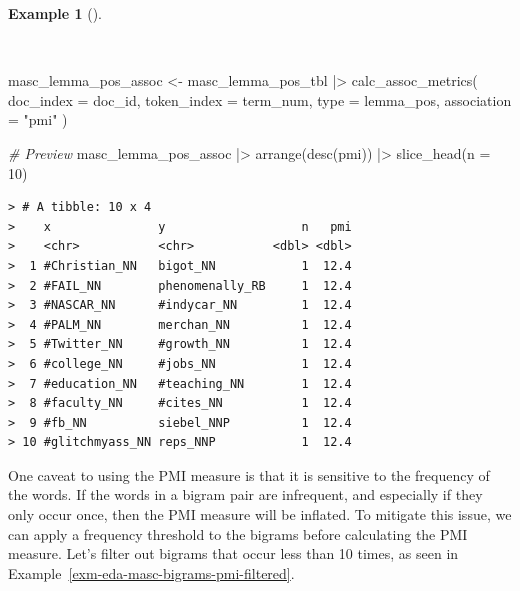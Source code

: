 \documentclass[
  letterpaper,
  DIV=11,
  numbers=noendperiod]{scrreport}
\newenvironment{Shaded}{\begin{snugshade}}{\end{snugshade}}
\newcommand{\AttributeTok}[1]{\textcolor[rgb]{0.00,0.00,0.00}{#1}}
\newcommand{\CommentTok}[1]{\textcolor[rgb]{0.00,0.00,0.00}{\textit{#1}}}
\newcommand{\DecValTok}[1]{\textcolor[rgb]{0.00,0.00,0.00}{#1}}
\newcommand{\FunctionTok}[1]{\textcolor[rgb]{0.00,0.00,0.00}{#1}}
\newcommand{\NormalTok}[1]{\textcolor[rgb]{0.00,0.00,0.00}{#1}}
\newcommand{\OtherTok}[1]{\textcolor[rgb]{0.00,0.00,0.00}{#1}}
\newcommand{\SpecialCharTok}[1]{\textcolor[rgb]{0.00,0.00,0.00}{#1}}
\newcommand{\StringTok}[1]{\textcolor[rgb]{0.00,0.00,0.00}{#1}}
\theoremstyle{definition}
\newtheorem{example}{Example}[chapter]
\theoremstyle{remark}
\begin{document}
\begin{example}[]\protect\hypertarget{exm-eda-masc-bigrams-pmi}{}\label{exm-eda-masc-bigrams-pmi}

~

\begin{Shaded}
\begin{Highlighting}[]
\NormalTok{masc\_lemma\_pos\_assoc }\OtherTok{\textless{}{-}} 
\NormalTok{  masc\_lemma\_pos\_tbl }\SpecialCharTok{|\textgreater{}} 
  \FunctionTok{calc\_assoc\_metrics}\NormalTok{(}
    \AttributeTok{doc\_index =}\NormalTok{ doc\_id, }
    \AttributeTok{token\_index =}\NormalTok{ term\_num, }
    \AttributeTok{type =}\NormalTok{ lemma\_pos, }
    \AttributeTok{association =} \StringTok{"pmi"}
\NormalTok{  )}

\CommentTok{\# Preview }
\NormalTok{masc\_lemma\_pos\_assoc }\SpecialCharTok{|\textgreater{}} 
  \FunctionTok{arrange}\NormalTok{(}\FunctionTok{desc}\NormalTok{(pmi)) }\SpecialCharTok{|\textgreater{}}
  \FunctionTok{slice\_head}\NormalTok{(}\AttributeTok{n =} \DecValTok{10}\NormalTok{)}
\end{Highlighting}
\end{Shaded}

\begin{verbatim}
> # A tibble: 10 x 4
>    x               y                   n   pmi
>    <chr>           <chr>           <dbl> <dbl>
>  1 #Christian_NN   bigot_NN            1  12.4
>  2 #FAIL_NN        phenomenally_RB     1  12.4
>  3 #NASCAR_NN      #indycar_NN         1  12.4
>  4 #PALM_NN        merchan_NN          1  12.4
>  5 #Twitter_NN     #growth_NN          1  12.4
>  6 #college_NN     #jobs_NN            1  12.4
>  7 #education_NN   #teaching_NN        1  12.4
>  8 #faculty_NN     #cites_NN           1  12.4
>  9 #fb_NN          siebel_NNP          1  12.4
> 10 #glitchmyass_NN reps_NNP            1  12.4
\end{verbatim}

\end{example}

One caveat to using the PMI measure is that it is sensitive to the
frequency of the words. If the words in a bigram pair are infrequent,
and especially if they only occur once, then the PMI measure will be
inflated. To mitigate this issue, we can apply a frequency threshold to
the bigrams before calculating the PMI measure. Let's filter out bigrams
that occur less than 10 times, as seen in
Example~\ref{exm-eda-masc-bigrams-pmi-filtered}.
\end{document}
